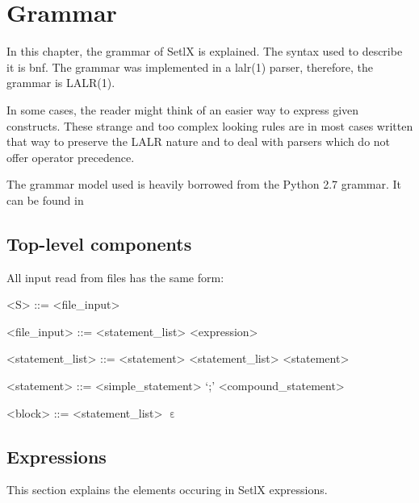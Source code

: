 \section{Grammar}

In this chapter, the grammar of SetlX is explained. The syntax used to describe it is \gls{bnf}. The grammar was implemented in a \gls{lalr}(1) parser, therefore, the grammar is LALR(1). 

In some cases, the reader might think of an easier way to express given constructs. These strange and too complex looking rules are in most cases written that way to preserve the LALR nature and to deal with parsers which do not offer operator precedence.

The grammar model used is heavily borrowed from the Python 2.7 grammar. It can be found in 

%
%
\subsection{Top-level components}

All input read from files has the same form:

\begin{grammar}
<S> ::= <file_input>

<file_input> ::= <statement_list>
\alt <expression>

<statement_list> ::= <statement>
\alt <statement_list> <statement>

<statement> ::= <simple_statement> `;'
\alt <compound_statement>

<block> ::= <statement_list>
\alt $\upepsilon$
\end{grammar}

%
%
\clearpage
\subsection{Expressions}

This section explains the elements occuring in SetlX expressions.

